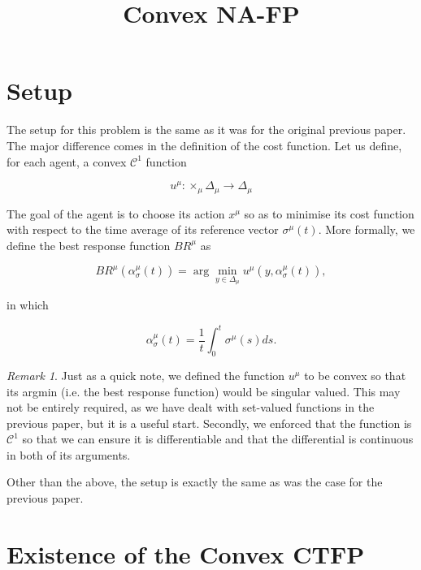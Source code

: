 \documentclass[preprint,12pt]{article}
\title{Convex NA-FP}
\theoremstyle{definition}
\theoremstyle{theorem}
\theoremstyle{remark}
\newtheorem*{remark}{Remark}
\theoremstyle{example}
\begin{document}
	\maketitle
	
	\section{Setup}
	
	The setup for this problem is the same as it was for the original previous paper. The major difference comes in the definition of the cost function. Let us define, for each agent, a convex $\mathcal{C}^1$ function
	
	\begin{equation}
			u^\mu: \times_{\mu} \Delta_\mu \rightarrow \Delta_\mu
	\end{equation}

	The goal of the agent is to choose its action $x^\mu$ so as to minimise its cost function with respect to the time average of its reference vector $\sigma^\mu (t)$. More formally, we define the best response function $BR^\mu$ as 
	
	\begin{equation}
		BR^\mu(\alpha_\sigma^\mu(t) )= \arg \min_{y \in \Delta_\mu} u^\mu(y, \alpha_\sigma^\mu (t)), 
	\end{equation}
	
	in which
	
	\begin{equation}
		\alpha_\sigma^\mu(t) = \frac{1}{t} \int_0^t \sigma^\mu(s) ds.
	\end{equation}
	
	\begin{remark}
		Just as a quick note, we defined the function $u^\mu$ to be convex so that its argmin (i.e. the best response function) would be singular valued. This may not be entirely required, as we have dealt with set-valued functions in the previous paper, but it is a useful start. Secondly, we enforced that the function is $\mathcal{C}^1$ so that we can ensure it is differentiable and that the differential is continuous in both of its arguments. 
	\end{remark}
	
	Other than the above, the setup is exactly the same as was the case for the previous paper.
	
	\section{Existence of the Convex CTFP}
	
\end{document}
